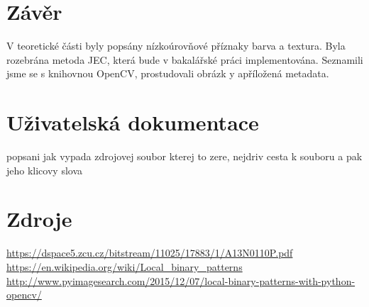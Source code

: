 \documentclass{report}
\begin{document}
\chapter{Závěr}
V teoretické části byly popsány nízkoúrovňové příznaky barva a textura. Byla rozebrána metoda JEC, která bude v bakalářské práci implementována. Seznamili jsme se s knihovnou OpenCV, prostudovali obrázk y apříložená metadata.

\chapter{Uživatelská dokumentace}
popsani jak vypada zdrojovej soubor kterej to zere, nejdriv cesta k souboru a pak jeho klicovy slova

\chapter{Zdroje}
\url{https://dspace5.zcu.cz/bitstream/11025/17883/1/A13N0110P.pdf} \\
\url{https://en.wikipedia.org/wiki/Local_binary_patterns} \\
\url{http://www.pyimagesearch.com/2015/12/07/local-binary-patterns-with-python-opencv/} \\
\end{document}
